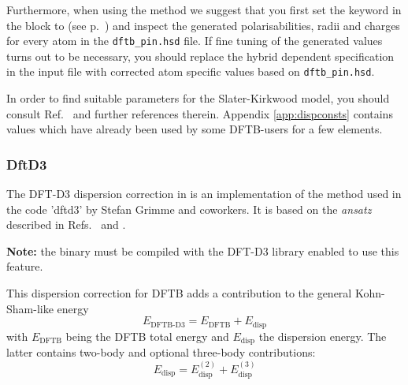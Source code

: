 Furthermore, when using the  method we
suggest that you first set the  keyword in the
 block to  (see p.~) and
inspect the generated polarisabilities, radii and charges for every
atom in the \verb|dftb_pin.hsd| file. If fine tuning of the generated
values turns out to be necessary, you should replace the hybrid
dependent specification in the input file with corrected atom
specific values based on \verb|dftb_pin.hsd|.

In order to find suitable parameters for the Slater-Kirkwood model,
you should consult Ref.~\cite{elstner-jcp-114-5149} and further
references therein. Appendix \ref{app:dispconsts} contains values
which have already been used by some DFTB-users for a few elements.

\subsubsection{DftD3}
\label{sec:dftbp.DftD3}

The DFT-D3 dispersion correction in \dftbp{} is an implementation of the method
used in the code 'dftd3' by Stefan Grimme and coworkers.  It is based on the
{\it ansatz} described in Refs.~\cite{grimme-jcp-132-154104} and
\cite{grimme-jcp-32-1456-1465}.

\textbf{Note:} the \dftbp{} binary must be compiled with the DFT-D3 library enabled to use this
feature.

This dispersion correction for DFTB adds a contribution to the general
Kohn-Sham-like energy
\begin{equation*}
  E_{\text{DFTB-D3}} = E_{\text{DFTB}} + E_{\text{disp}}
\end{equation*}
with $E_{\text{DFTB}}$ being the DFTB total energy and $E_{\text{disp}}$ the
dispersion energy. The latter contains two-body and optional three-body
contributions:
\begin{equation*}
  E_{\text{disp}} = E_{\text{disp}}^{(2)} + E_{\text{disp}}^{(3)}
\end{equation*}

